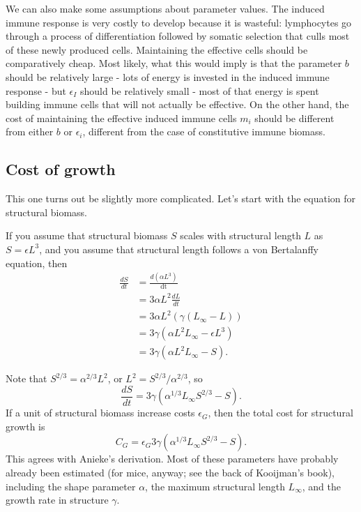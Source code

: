 \documentclass[12pt,reqno,final,pdftex]{amsart}\usepackage[]{graphicx}\usepackage[]{color}
\theoremstyle{plain}
\numberwithin{equation}{part}
\begin{document}
We can also make some assumptions about parameter values.
The induced immune response is very costly to develop because it is wasteful: lymphocytes go through a process of differentiation followed by somatic selection that culls most of these newly produced cells.
Maintaining the effective cells should be comparatively cheap.
Most likely, what this would imply is that the parameter $b$ should be relatively large - lots of energy is invested in the induced immune response - but $\epsilon_I$ should be relatively small - most of that energy is spent building immune cells that will not actually be effective.
On the other hand, the cost of maintaining the effective induced immune cells $m_i$ should be different from either $b$ or $\epsilon_i$, different from the case of constitutive immune biomass.

\subsection*{Cost of growth}
This one turns out be slightly more complicated.
Let's start with the equation for structural biomass.

If you assume that structural biomass $S$ scales with structural length $L$ as $S =\epsilon L^3$, and you assume that structural length
follows a von Bertalanffy equation, then
\begin{align}
\frac{dS}{dt} &=\frac{d\left(\alpha L^3\right)}{\text{dt}} \\
& =3\alpha  L^2 \frac{dL}{dt} \\
& =3 \alpha  L^2 \left(\gamma \left(L_{\infty}-L\right)\right) \\
& =3 \gamma \left(\alpha  L^2 L_{\infty}-\epsilon  L^3\right) \\
& =3 \gamma \left(\alpha  L^2L_{\infty }-S\right).
\end{align}

Note that $S^{2/3}=\alpha^{2/3}L^2$, or $L^2=S^{2/3}/\alpha^{2/3}$, so
\begin{equation}
\frac{dS}{dt}=3\gamma  \left(\alpha^{1/3}L_{\infty }S^{2/3}-S\right).
\end{equation}
If a unit of structural biomass increase costs $\epsilon_G$, then the total cost for structural growth is
\begin{equation}
C_G = \epsilon _G 3\gamma  \left(\alpha ^{1/3}L_{\infty }S^{2/3}-S\right).
\end{equation}
This agrees with Anieke's derivation.
Most of these parameters have probably already been estimated (for mice, anyway; see the back of Kooijman's book), including the shape parameter $\alpha$, the maximum structural length $L_{\infty }$, and the growth rate in structure $\gamma$.
\end{document}

